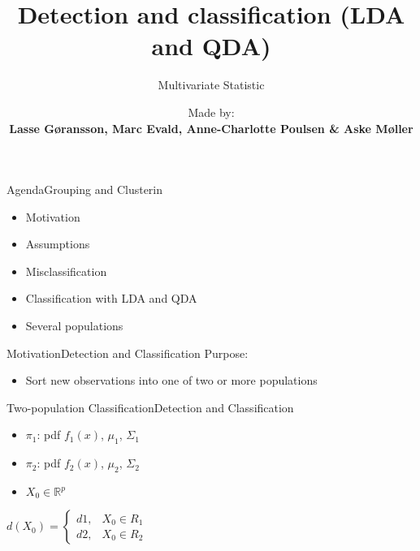 \documentclass[aspectratio=169,10pt,t]{beamer}
\title{Detection and classification (LDA and QDA)}
\subtitle{Multivariate Statistic}
\date{ }
\author{
	Made by: \\
	\textbf{Lasse Gøransson, Marc Evald, Anne-Charlotte Poulsen \& Aske Møller}
}
\institute[
  SDU Robotics\\
  The Maersk Mc-Kinney Moller Institute\\
  University of Southern Denmark
] %
{%
  SDU Robotics\\
  The Maersk Mc-Kinney Moller Institute\\
  University of Southern Denmark

}
\begin{document}
{\SDUwavesbg%
\begin{frame} %
  \titlepage
\end{frame}}

\begin{frame}{Agenda}{Grouping and Clusterin}{\vphantom{(y}}
\begin{itemize}
    \item Motivation
		\item Assumptions 
		\item Misclassification
		\item Classification with LDA and QDA
		\item Several populations
\end{itemize}
\end{frame}

\setcounter{page}{1}
\begin{frame}{Motivation}{Detection and Classification}
    Purpose: 
    \begin{itemize}
        \item Sort new observations into one of two or more populations
    \end{itemize}
\end{frame}

\begin{frame}{Two-population Classification}{Detection and Classification}
    \begin{itemize}
        \item $\pi_1$: pdf $f_1(x)$, $\mu_1$, $\Sigma_1$
        \item $\pi_2$: pdf $f_2(x)$, $\mu_2$, $\Sigma_2$
				\item $X_0 \in \mathbb{R}^p$ \\
    \end{itemize}

		\vspace{2cm}

    \quad $d(X_0) = \begin{cases} d1, &X_0 \in R_1 \\ d2, &X_0 \in R_2 \end{cases}$ \\
\end{frame}
\end{document}
